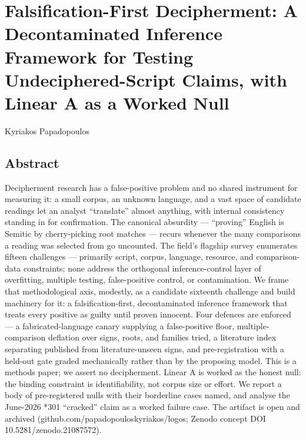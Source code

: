 \documentclass[
  10pt,
]{article}
\author{}
\date{}
\begin{document}
\hypertarget{falsification-first-decipherment-a-decontaminated-inference-framework-for-testing-undeciphered-script-claims-with-linear-a-as-a-worked-null}{%
\section{Falsification-First Decipherment: A Decontaminated Inference
Framework for Testing Undeciphered-Script Claims, with Linear A as a
Worked
Null}\label{falsification-first-decipherment-a-decontaminated-inference-framework-for-testing-undeciphered-script-claims-with-linear-a-as-a-worked-null}}

Kyriakos Papadopoulos

\hypertarget{abstract}{%
\subsection{Abstract}\label{abstract}}

Decipherment research has a false-positive problem and no shared
instrument for measuring it: a small corpus, an unknown language, and a
vast space of candidate readings let an analyst ``translate'' almost
anything, with internal consistency standing in for confirmation. The
canonical absurdity --- ``proving'' English is Semitic by cherry-picking
root matches --- recurs whenever the many comparisons a reading was
selected from go uncounted. The field's flagship survey enumerates
fifteen challenges --- primarily script, corpus, language, resource, and
comparison-data constraints; none address the orthogonal
inference-control layer of overfitting, multiple testing, false-positive
control, or contamination. We frame that methodological axis, modestly,
as a candidate sixteenth challenge and build machinery for it: a
falsification-first, decontaminated inference framework that treats
every positive as guilty until proven innocent. Four defences are
enforced --- a fabricated-language canary supplying a false-positive
floor, multiple-comparison deflation over signs, roots, and families
tried, a literature index separating published from literature-unseen
signs, and pre-registration with a held-out gate graded mechanically
rather than by the proposing model. This is a methods paper; we assert
no decipherment. Linear A is worked as the honest null: the binding
constraint is identifiability, not corpus size or effort. We report a
body of pre-registered nulls with their borderline cases named, and
analyse the June-2026 *301 ``cracked'' claim as a worked failure case.
The artifact is open and archived
(github.com/papadopouloskyriakos/logos; Zenodo concept DOI
10.5281/zenodo.21087572).
\end{document}
